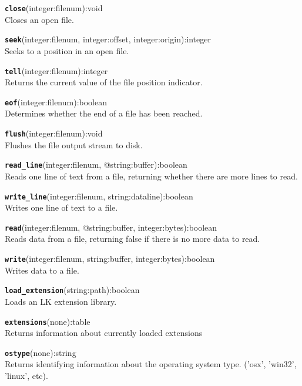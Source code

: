 \hrulefill

\texttt{{\large\textbf{close}}}\textsf{(integer:filenum):void}\\
 Closes an open file.

\hrulefill

\texttt{{\large\textbf{seek}}}\textsf{(integer:filenum, integer:offset, integer:origin):integer}\\
 Seeks to a position in an open file.

\hrulefill

\texttt{{\large\textbf{tell}}}\textsf{(integer:filenum):integer}\\
 Returns the current value of the file position indicator.

\hrulefill

\texttt{{\large\textbf{eof}}}\textsf{(integer:filenum):boolean}\\
 Determines whether the end of a file has been reached.

\hrulefill

\texttt{{\large\textbf{flush}}}\textsf{(integer:filenum):void}\\
 Flushes the file output stream to disk.

\hrulefill

\texttt{{\large\textbf{read\_line}}}\textsf{(integer:filenum, @string:buffer):boolean}\\
 Reads one line of text from a file, returning whether there are more lines to read.

\hrulefill

\texttt{{\large\textbf{write\_line}}}\textsf{(integer:filenum, string:dataline):boolean}\\
 Writes one line of text to a file.

\hrulefill

\texttt{{\large\textbf{read}}}\textsf{(integer:filenum, @string:buffer, integer:bytes):boolean}\\
 Reads data from a file, returning false if there is no more data to read.

\hrulefill

\texttt{{\large\textbf{write}}}\textsf{(integer:filenum, string:buffer, integer:bytes):boolean}\\
 Writes data to a file.

\hrulefill

\texttt{{\large\textbf{load\_extension}}}\textsf{(string:path):boolean}\\
 Loads an LK extension library.

\hrulefill

\texttt{{\large\textbf{extensions}}}\textsf{(none):table}\\
 Returns information about currently loaded extensions

\hrulefill

\texttt{{\large\textbf{ostype}}}\textsf{(none):string}\\
 Returns identifying information about the operating system type. ('osx', 'win32', 'linux', etc).
